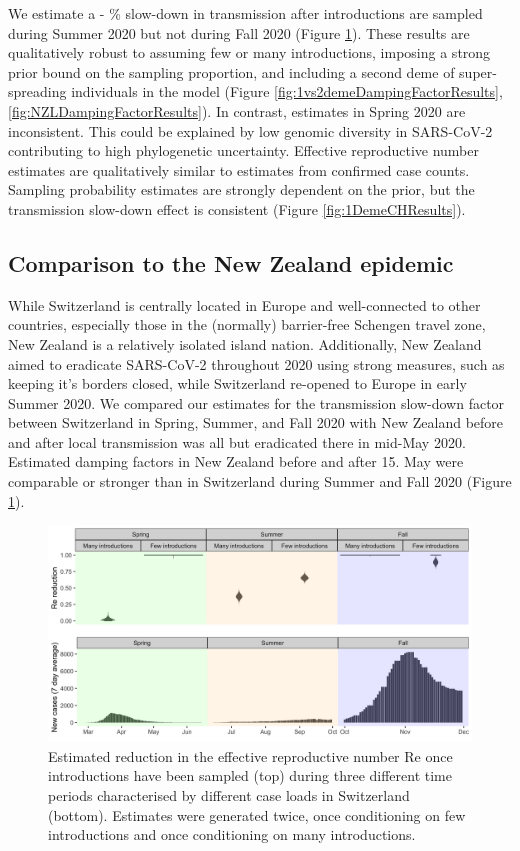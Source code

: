 \documentclass[9pt,twoside,lineno]{pnas-new} %
\begin{document}
We estimate a \summermaxdamplingpercentmedianCHEnosampUB - \summermindamplingpercentmedianCHEnosampUB\% slow-down in transmission after introductions are sampled during Summer 2020 but not during Fall 2020 (Figure \ref{fig:scale-factor}). These results are qualitatively robust to assuming few or many introductions, imposing a strong prior bound on the sampling proportion, and including a second deme of super-spreading individuals in the model (Figure \ref{fig:1vs2demeDampingFactorResults}, \ref{fig:NZLDampingFactorResults}). In contrast, estimates in Spring 2020 are inconsistent. This could be explained by low genomic diversity in SARS-CoV-2 contributing to high phylogenetic uncertainty. Effective reproductive number estimates are qualitatively similar to estimates from confirmed case counts. Sampling probability estimates are strongly dependent on the prior, but the transmission slow-down effect is consistent (Figure \ref{fig:1DemeCHResults}).

\subsection{Comparison to the New Zealand epidemic}
While Switzerland is centrally located in Europe and well-connected to other countries, especially those in the (normally) barrier-free Schengen travel zone, New Zealand is a relatively isolated island nation. Additionally, New Zealand aimed to eradicate SARS-CoV-2 throughout 2020 using strong measures, such as keeping it's borders closed, while Switzerland re-opened to Europe in early Summer 2020. We compared our estimates for the transmission slow-down factor between Switzerland in Spring, Summer, and Fall 2020 with New Zealand before and after local transmission was all but eradicated there in mid-May 2020. Estimated damping factors in New Zealand before and after 15. May were comparable or stronger than in Switzerland during Summer and Fall 2020 (Figure \ref{fig:scale-factor}).

\begin{figure}[H]
\centering
\includegraphics[width=\linewidth]{figures/contact_tracing_factors_no_sampUB_compared_to_cases.png}
\caption{Estimated reduction in the effective reproductive number Re once introductions have been sampled (top) during three different time periods characterised by different case loads in Switzerland (bottom). Estimates were generated twice, once conditioning on few introductions and once conditioning on many introductions.}  
\label{fig:scale-factor}
\end{figure}
\end{document}
